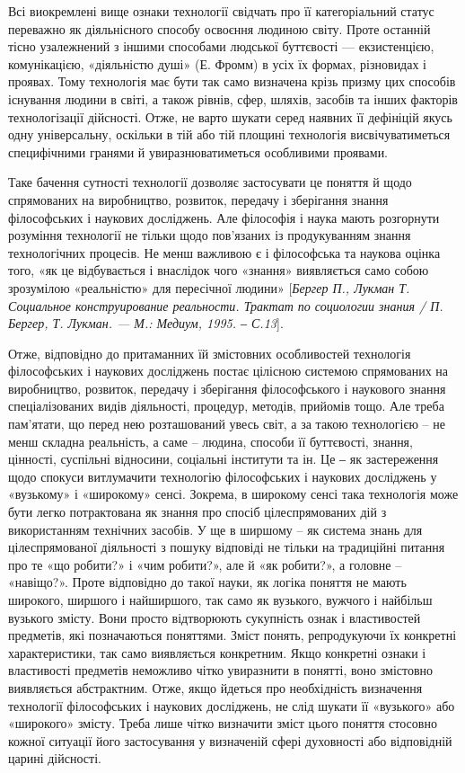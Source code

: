 Всі виокремлені вище ознаки технології свідчать про її категоріальний
статус переважно як діяльнісного способу освоєння людиною світу. Проте
останній тісно узалежнений з іншими способами людської буттєвості ---
екзистенцією, комунікацією, «діяльністю душі» (Е. Фромм) в усіх їх формах,
різновидах і проявах. Тому технологія має бути так само визначена крізь
призму цих способів існування людини в світі, а також рівнів, сфер, шляхів,
засобів та інших факторів технологізації дійсності. Отже, не варто шукати
серед наявних її дефініцій якусь одну універсальну, оскільки в тій або тій
площині технологія висвічуватиметься специфічними гранями й
увиразнюватиметься особливими проявами.

Таке бачення сутності технології дозволяє застосувати це поняття й щодо
спрямованих на виробництво, розвиток, передачу і зберігання знання
філософських і наукових досліджень. Але філософія і наука мають розгорнути
розуміння технології не тільки щодо пов’язаних із продукуванням знання
технологічних процесів. Не менш важливою є і філософська та наукова оцінка
того, «як це відбувається і внаслідок чого «знання» виявляється само собою
зрозумілою «реальністю» для пересічної людини» [\textit{Бергер П., Лукман Т.
Социальное конструирование реальности. Трактат по социологии знания / П.
Бергер, Т. Лукман. --- М.: Медиум, 1995. ‒ С.13}].

Отже, відповідно до притаманних їй змістовних особливостей технологія
філософських і наукових досліджень постає цілісною системою спрямованих на
виробництво, розвиток, передачу і зберігання філософського і наукового знання
спеціалізованих видів діяльності, процедур, методів, прийомів тощо. Але треба
пам’ятати, що перед нею розташований увесь світ, а за такою технологією – не
менш складна реальність, а саме – людина, способи її буттєвості, знання,
цінності, суспільні відносини, соціальні інститути та ін. Це ‒ як застереження
щодо спокуси витлумачити технологію філософських і наукових досліджень у
«вузькому» і «широкому» сенсі. Зокрема, в широкому сенсі така технологія
може бути легко потрактована як знання про спосіб цілеспрямованих дій з
використанням технічних засобів. У ще в ширшому – як система знань для
цілеспрямованої діяльності з пошуку відповіді не тільки на традиційні питання
про те «що робити?» і «чим робити?», але й «як робити?», а головне –
«навіщо?». Проте відповідно до такої науки, як логіка поняття не мають
широкого, ширшого і найширшого, так само як вузького, вужчого і найбільш
вузького змісту. Вони просто відтворюють сукупність ознак і властивостей
предметів, які позначаються поняттями. Зміст понять, репродукуючи їх
конкретні характеристики, так само виявляється конкретним. Якщо конкретні
ознаки і властивості предметів неможливо чітко увиразнити в понятті, воно
змістовно виявляється абстрактним. Отже, якщо йдеться про необхідність
визначення технології філософських і наукових досліджень, не слід шукати її
«вузького» або «широкого» змісту. Треба лише чітко визначити зміст цього
поняття стосовно кожної ситуації його застосування у визначеній сфері
духовності або відповідній царині дійсності.

